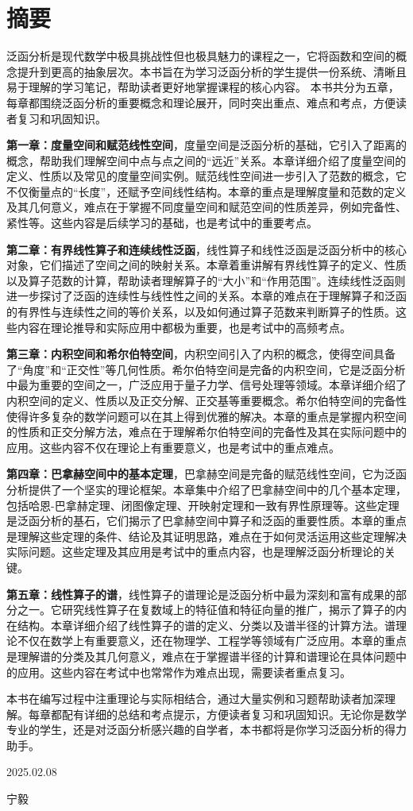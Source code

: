 \chapter*{摘要} 
泛函分析是现代数学中极具挑战性但也极具魅力的课程之一，它将函数和空间的概念提升到更高的抽象层次。本书旨在为学习泛函分析的学生提供一份系统、清晰且易于理解的学习笔记，帮助读者更好地掌握课程的核心内容。
本书共分为五章，每章都围绕泛函分析的重要概念和理论展开，同时突出重点、难点和考点，方便读者复习和巩固知识。

\textbf{第一章：度量空间和赋范线性空间}，度量空间是泛函分析的基础，它引入了距离的概念，帮助我们理解空间中点与点之间的“远近”关系。本章详细介绍了度量空间的定义、性质以及常见的度量空间实例。赋范线性空间进一步引入了范数的概念，它不仅衡量点的“长度”，还赋予空间线性结构。本章的重点是理解度量和范数的定义及其几何意义，难点在于掌握不同度量空间和赋范空间的性质差异，例如完备性、紧性等。这些内容是后续学习的基础，也是考试中的重要考点。

\textbf{第二章：有界线性算子和连续线性泛函}，线性算子和线性泛函是泛函分析中的核心对象，它们描述了空间之间的映射关系。本章着重讲解有界线性算子的定义、性质以及算子范数的计算，帮助读者理解算子的“大小”和“作用范围”。连续线性泛函则进一步探讨了泛函的连续性与线性性之间的关系。本章的难点在于理解算子和泛函的有界性与连续性之间的等价关系，以及如何通过算子范数来判断算子的性质。这些内容在理论推导和实际应用中都极为重要，也是考试中的高频考点。

\textbf{第三章：内积空间和希尔伯特空间}，内积空间引入了内积的概念，使得空间具备了“角度”和“正交性”等几何性质。希尔伯特空间是完备的内积空间，它是泛函分析中最为重要的空间之一，广泛应用于量子力学、信号处理等领域。本章详细介绍了内积空间的定义、性质以及正交分解、正交基等重要概念。希尔伯特空间的完备性使得许多复杂的数学问题可以在其上得到优雅的解决。本章的重点是掌握内积空间的性质和正交分解方法，难点在于理解希尔伯特空间的完备性及其在实际问题中的应用。这些内容不仅在理论上有重要意义，也是考试中的重点难点。

\textbf{第四章：巴拿赫空间中的基本定理}，巴拿赫空间是完备的赋范线性空间，它为泛函分析提供了一个坚实的理论框架。本章集中介绍了巴拿赫空间中的几个基本定理，包括哈恩-巴拿赫定理、闭图像定理、开映射定理和一致有界性原理等。这些定理是泛函分析的基石，它们揭示了巴拿赫空间中算子和泛函的重要性质。本章的重点是理解这些定理的条件、结论及其证明思路，难点在于如何灵活运用这些定理解决实际问题。这些定理及其应用是考试中的重点内容，也是理解泛函分析理论的关键。

\textbf{第五章：线性算子的谱}，线性算子的谱理论是泛函分析中最为深刻和富有成果的部分之一。它研究线性算子在复数域上的特征值和特征向量的推广，揭示了算子的内在结构。本章详细介绍了线性算子的谱的定义、分类以及谱半径的计算方法。谱理论不仅在数学上有重要意义，还在物理学、工程学等领域有广泛应用。本章的重点是理解谱的分类及其几何意义，难点在于掌握谱半径的计算和谱理论在具体问题中的应用。这些内容在考试中也常常作为难点出现，需要读者重点复习。

本书在编写过程中注重理论与实际相结合，通过大量实例和习题帮助读者加深理解。每章都配有详细的总结和考点提示，方便读者复习和巩固知识。无论你是数学专业的学生，还是对泛函分析感兴趣的自学者，本书都将是你学习泛函分析的得力助手。


\begin{flushright}
	2025.02.08

    宁毅
\end{flushright}